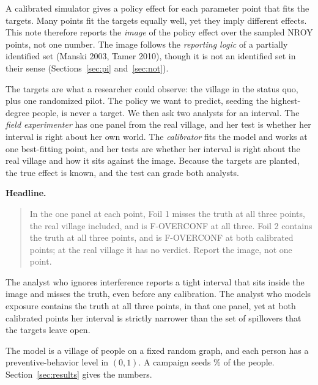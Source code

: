 \documentclass[11pt]{article}
\begin{document}
\hypersetup{pageanchor=false}

\hypersetup{pageanchor=true}

\noindent
A calibrated simulator gives a policy effect for each parameter point
that fits the targets. Many points fit the targets equally well, yet
they imply different effects. This note therefore reports the
\emph{image} of the policy effect over the sampled NROY points, not one
number. The image follows the \emph{reporting logic} of a partially
identified set (Manski 2003, Tamer 2010), though it is not an identified set in their
sense (Sections~\ref{sec:pi} and~\ref{sec:not}).

The targets are what a researcher could observe: the village in the
status quo, plus one randomized pilot. The policy we want to predict,
seeding the highest-degree people, is never a target. We then ask two
analysts for an interval. The \emph{field experimenter} has one panel
from the real village, and her test is whether her interval is right
about her own world. The \emph{calibrator} fits the model and works at
one best-fitting point, and her tests are whether her interval is right
about the real village and how it sits against the image. Because the
targets are planted, the true effect is known, and the test can grade
both analysts.

\medskip
\noindent\textbf{Headline.}
\begin{quote}
In the one panel at each point, Foil 1 misses the truth at all three
points, the real village included, and is F-OVERCONF at all three. Foil 2
contains the truth at all three points, and is F-OVERCONF at both
calibrated points; at the real village it has no verdict. Report the
image, not one point.
\end{quote}
The analyst who ignores interference reports a tight interval that sits
inside the image and misses the truth, even before any calibration. The
analyst who models exposure contains the truth at all three points, in that one panel, yet at both
calibrated points her interval is strictly narrower than the set of
spillovers that the targets leave open.

The model is a village of \NAgents{} people on a fixed random graph, and
each person has a preventive-behavior level in $(0,1)$. A campaign seeds
\SeedSharePct\% of the people. Section~\ref{sec:results} gives the
numbers.
\end{document}
